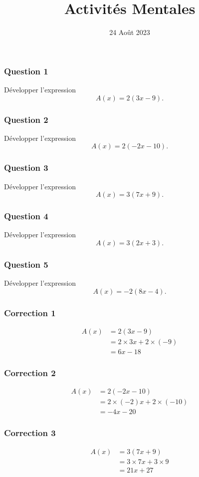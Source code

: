\documentclass[15pt, mathserif]{beamer}
\title{Activités Mentales}
\date{24 Août 2023}
\begin{document}
\begin{frame}
    \titlepage
\end{frame}

\begin{frame} 
	\frametitle{Question 1}
	Développer l'expression \[A(x) = 2\left(3 x-9\right). \]\end{frame}


\begin{frame} 
	\frametitle{Question 2}
	Développer l'expression \[A(x) = 2\left(-2 x-10\right). \]\end{frame}


\begin{frame} 
	\frametitle{Question 3}
	Développer l'expression \[A(x) = 3\left(7 x+9\right). \]\end{frame}


\begin{frame} 
	\frametitle{Question 4}
	Développer l'expression \[A(x) = 3\left(2 x+3\right). \]\end{frame}


\begin{frame} 
	\frametitle{Question 5}
	Développer l'expression \[A(x) = -2\left(8 x-4\right). \]\end{frame}


\begin{frame}
\vspace{-10mm}
	\frametitle{Correction 1}
	\begin{align*} A(x) &= 2\left(3 x-9\right) \\
		&=2\times3 x+2\times\left(-9\right)\\
		&=6 x-18
	\end{align*}\end{frame}


\begin{frame}
\vspace{-10mm}
	\frametitle{Correction 2}
	\begin{align*} A(x) &= 2\left(-2 x-10\right) \\
		&=2\times\left(-2\right) x+2\times\left(-10\right)\\
		&=-4 x-20
	\end{align*}\end{frame}


\begin{frame}
\vspace{-10mm}
	\frametitle{Correction 3}
	\begin{align*} A(x) &= 3\left(7 x+9\right) \\
		&=3\times7 x+3\times9\\
		&=21 x+27
	\end{align*}\end{frame}
\end{document}
